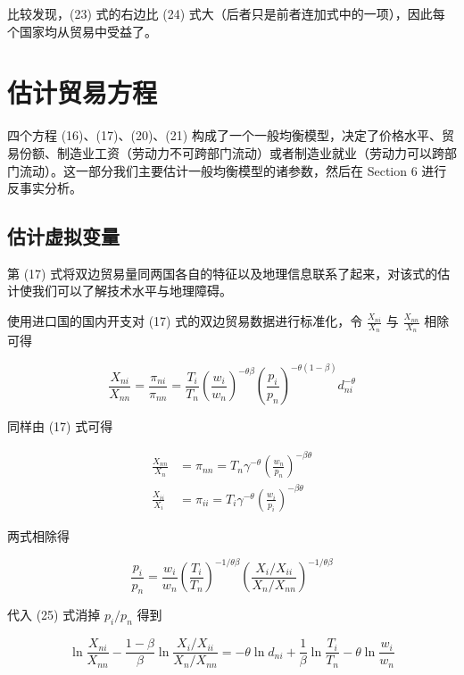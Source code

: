 \documentclass[
]{article}
\begin{document}
比较发现，(23) 式的右边比 (24) 式大（后者只是前者连加式中的一项），因此每个国家均从贸易中受益了。

\hypertarget{estimate-general-equilibrium}{%
\section{估计贸易方程}\label{estimate-general-equilibrium}}

四个方程 (16)、(17)、(20)、(21) 构成了一个一般均衡模型，决定了价格水平、贸易份额、制造业工资（劳动力不可跨部门流动）或者制造业就业（劳动力可以跨部门流动）。这一部分我们主要估计一般均衡模型的诸参数，然后在 Section 6 进行反事实分析。

\hypertarget{ux4f30ux8ba1ux865aux62dfux53d8ux91cf}{%
\subsection{估计虚拟变量}\label{ux4f30ux8ba1ux865aux62dfux53d8ux91cf}}

第 (17) 式将双边贸易量同两国各自的特征以及地理信息联系了起来，对该式的估计使我们可以了解技术水平与地理障碍。

使用进口国的国内开支对 (17) 式的双边贸易数据进行标准化，令
\(\frac{X_{ni}}{X_n}\) 与 \(\frac{X_{nn}}{X_n}\) 相除可得

\[
\frac{X_{n i}}{X_{n n}}=\frac{\pi_{n i}}{\pi_{n n}}=\frac{T_{i}}{T_{n}}\left(\frac{w_{i}}{w_{n}}\right)^{-\theta \beta}\left(\frac{p_{i}}{p_{n}}\right)^{-\theta(1-\beta)} d_{n i}^{-\theta} \tag{25}
\]

同样由 (17) 式可得

\[
\begin{aligned}
\frac{X_{n n}}{X_{n}}&=\pi_{n n}=T_{n}\gamma^{-\theta}\left(\frac{w_{n}}{p_{n}}\right)^{-\beta\theta } \\
\frac{X_{i i}}{X_{i}}&=\pi_{i i}=T_{i}\gamma^{-\theta}\left(\frac{w_{i}}{p_{i}}\right)^{-\beta\theta } 
\end{aligned}
\]

两式相除得

\[
\frac{p_{i}}{p_{n}}=\frac{w_{i}}{w_{n}}\left(\frac{T_{i}}{T_{n}}\right)^{-1 / \theta \beta}\left(\frac{X_{i} / X_{i i}}{X_{n} / X_{n n}}\right)^{-1 / \theta \beta}
\]

代入 (25) 式消掉 \({p_i}/{p_n}\) 得到

\[
\ln \frac{X_{n i}}{X_{n n}}-\frac{1-\beta}{\beta}\ln \frac{X_{i} / X_{i i}}{X_{n} / X_{n n}}=-\theta \ln d_{n i}+\frac{1}{\beta} \ln \frac{T_{i}}{T_{n}}-\theta \ln \frac{w_{i}}{w_{n}}
\]
\end{document}
